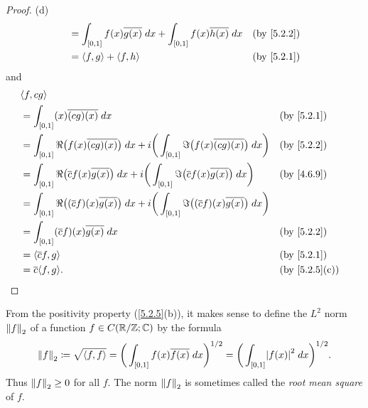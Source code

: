 \begin{proof}{(d)}
\begin{align*}
     & = \int_{[0, 1]} f(x) \overline{g(x)} \; dx + \int_{[0, 1]} f(x) \overline{h(x)} \; dx                                               &                                                      & \by{5.2.2} \\
     & = \inner*{f, g} + \inner*{f, h}                                                                                                     &                                                      & \by{5.2.1}
  \end{align*}
  and
  \begin{align*}
     & \inner*{f, cg}                                                                                                                                                                               \\
     & = \int_{[0, 1]} (x) \overline{(cg)(x)} \; dx                                                                                                                &  & \by{5.2.1}                  \\
     & = \int_{[0, 1]} \Re\big(f(x) \overline{(cg)(x)}\big) \; dx + i \bigg(\int_{[0, 1]} \Im\big(f(x) \overline{(cg)(x)}\big) \; dx\bigg)                         &  & \by{5.2.2}                  \\
     & = \int_{[0, 1]} \Re\big(\overline{c} f(x) \overline{g(x)}\big) \; dx + i \bigg(\int_{[0, 1]} \Im\big(\overline{c} f(x) \overline{g(x)}\big) \; dx\bigg)     &  & \by{4.6.9}                  \\
     & = \int_{[0, 1]} \Re\big((\overline{c} f)(x) \overline{g(x)}\big) \; dx + i \bigg(\int_{[0, 1]} \Im\big((\overline{c} f)(x) \overline{g(x)}\big) \; dx\bigg)                                  \\
     & = \int_{[0, 1]} (\overline{c} f)(x) \overline{g(x)} \; dx                                                                                                   &  & \by{5.2.2}                  \\
     & = \inner*{\overline{c} f, g}                                                                                                                                &  & \by{5.2.1}                  \\
     & = \overline{c} \inner*{f, g}.                                                                                                                               &  & \text{(by \cref{5.2.5}(c))}
  \end{align*}
\end{proof}

\begin{ac}\label{ac:5.2.1}
  From the positivity property (\cref{5.2.5}(b)), it makes sense to define the \(L^2\) norm \(\norm*{f}_2\) of a function \(f \in C(\R / \Z ; \C)\) by the formula
  \[
    \norm*{f}_2 \coloneqq \sqrt{\inner*{f, f}} = \bigg(\int_{[0, 1]} f(x) \overline{f(x)} \; dx\bigg)^{1 / 2} = \bigg(\int_{[0, 1]} \abs{f(x)}^2 \; dx\bigg)^{1 / 2}.
  \]
  Thus \(\norm*{f}_2 \geq 0\) for all \(f\).
  The norm \(\norm*{f}_2\) is sometimes called the \emph{root mean square} of \(f\).
\end{ac}


